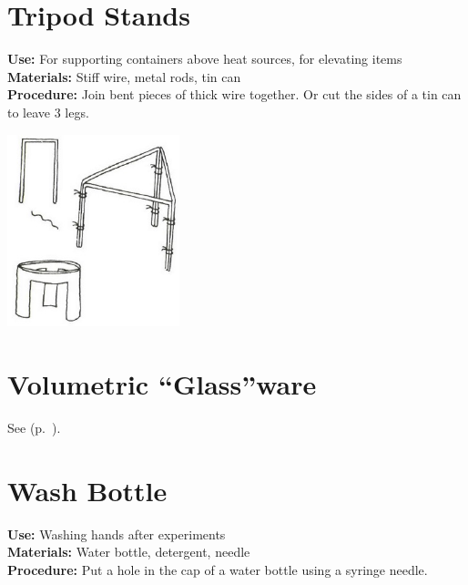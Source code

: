 \begin{multicols}{2}
\section{Tripod Stands}
\label{sec:tripod-stands}
\vspace{-10pt}
\textbf{Use:} For supporting containers above heat sources, for elevating items\\
\textbf{Materials:} Stiff wire, metal rods, tin can\\
\textbf{Procedure:} Join bent pieces of thick wire together. Or cut the sides of a tin can to leave 3 legs.
\begin{center}
\includegraphics[width=5cm]{./img/vso/tripod-stand.jpg}
\end{center}

\section{Volumetric ``Glass''ware}
\label{sec:volumetric-glassware}
See  (p.~\pageref{sec:containers}).

\section{Wash Bottle}
\label{sec:wash-bottle}
\vspace{-10pt}
\textbf{Use:} Washing hands after experiments\\
\textbf{Materials:} Water bottle, detergent, needle\\
\textbf{Procedure:} Put a hole in the cap of a water bottle using a syringe needle. 


\end{multicols}
